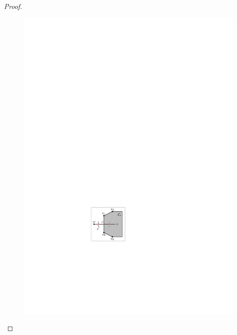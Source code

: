 \begin{proof}
\begin{figure}[t!]
    \centering
    \begin{minipage}[b]{.19\textwidth}
        \centering
        \includegraphics[width=\textwidth,page=1]{images/3planar_polygon}
        \subcaption{~}\label{fig:cs1}
    \end{minipage}
    \begin{minipage}[b]{.19\textwidth}
        \centering

\end{minipage}
\end{figure}
\end{proof}
